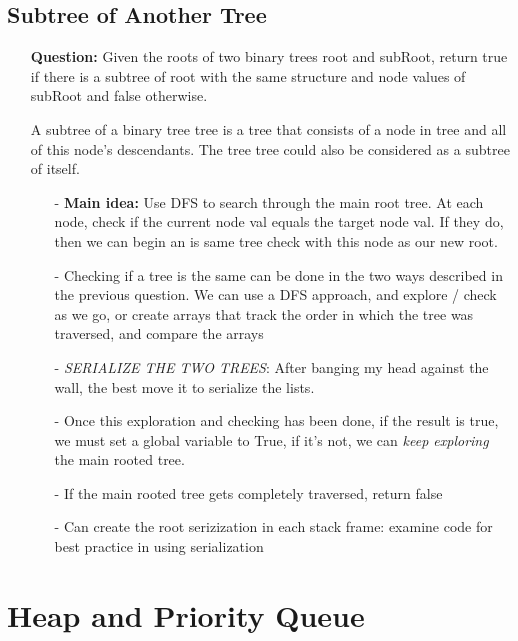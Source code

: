 \documentclass[12pt]{article}
\begin{document}
\subsection{Subtree of Another Tree}
\begin{enumerate}
  \item[] \textbf{Question:} Given the roots of two binary trees root and subRoot, return true if there is a subtree of root with the same structure and node values of subRoot and false otherwise.

A subtree of a binary tree tree is a tree that consists of a node in tree and all of this node's descendants. The tree tree could also be considered as a subtree of itself.


    \begin{enumerate}
      \item[-] \textbf{Main idea:} Use DFS to search through the main root tree. At each node, check if the current node val equals the target node val. If they do, then we can begin an is same tree check with this node as our new root. 
      \item[-] Checking if a tree is the same can be done in the two ways described in the previous question. We can use a DFS approach, and explore / check as we go, or create arrays that track the order in which the tree was traversed, and compare the arrays
      \item[-] \textit{SERIALIZE THE TWO TREES}: After banging my head against the wall, the best move it to serialize the lists.
      \item[-] Once this exploration and checking has been done, if the result is true, we must set a global variable to True, if it's not, we can  \textit{keep exploring} the main rooted tree. 
      \item[-] If the main rooted tree gets completely traversed, return false
      \item[-] Can create the root serizization in each stack frame: examine code for best practice in using serialization

    \end{enumerate}
\end{enumerate}

\section{Heap and Priority Queue}
\end{document}
